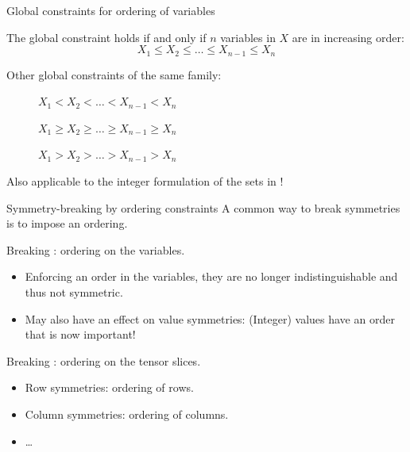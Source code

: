 \documentclass{cons-beamer}
\newcommand{\subsetSumProblem}{\problemClass{SubsetSum}}
\begin{document}
\begin{frame}{Global constraints for ordering of variables}
  \begin{definition}
    The  global constraint holds if and only if $n$ variables in $X$ are in increasing order:
    $$X_1 \leq X_2 \leq \ldots \leq X_{n-1} \leq X_{n}$$

    Other global constraints of the same family:

    \begin{description}
      \item[] $X_1 < X_{2} < \ldots < X_{n-1} < X_{n}$
      \item[] $X_1 \geq X_{2} \geq \ldots \geq X_{n-1} \geq X_{n}$
      \item[] $X_1 > X_{2} > \ldots > X_{n-1} > X_{n}$
    \end{description}
  \end{definition}

  Also applicable to the integer formulation of the sets in \subsetSumProblem!
\end{frame}


\begin{frame}{Symmetry-breaking by ordering constraints}
  A common way to break symmetries is to impose an ordering.
  \vfill

  Breaking : ordering on the variables.
  \vfill

  \begin{itemize}
    \item Enforcing an order in the variables, they are no longer indistinguishable and thus not symmetric.
    \item May also have an effect on value symmetries: (Integer) values have an order that is now important!
  \end{itemize}
  \vfill

  Breaking : ordering on the tensor slices.
  \begin{itemize}
    \item Row symmetries: ordering of rows.
    \item Column symmetries: ordering of columns.
    \item \dots
  \end{itemize}
  \vfill

\end{frame}
\end{document}
